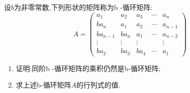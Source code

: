 \documentclass[../../main.tex]{subfiles}%
\begin{document}
\begin{proposition}[b-循环矩阵]\label{proposition:b-循环矩阵}
设\(b\)为非零常数,下列形状的矩阵称为b -循环矩阵:
\[
A = 
\begin{pmatrix}
a_1 & a_2 & a_3 & \cdots & a_n\\
ba_n & a_1 & a_2 & \cdots & a_{n - 1}\\
ba_{n - 1} & ba_n & a_1 & \cdots & a_{n - 2}\\
\vdots & \vdots & \vdots & & \vdots\\
ba_2 & ba_3 & ba_4 & \cdots & a_1
\end{pmatrix}
\]
\begin{enumerate}[(1)]
\item 证明:同阶b -循环矩阵的乘积仍然是b-循环矩阵;
\item 求上述b-循环矩阵\(A\)的行列式的值.
\end{enumerate}
\end{proposition}
\end{document}
